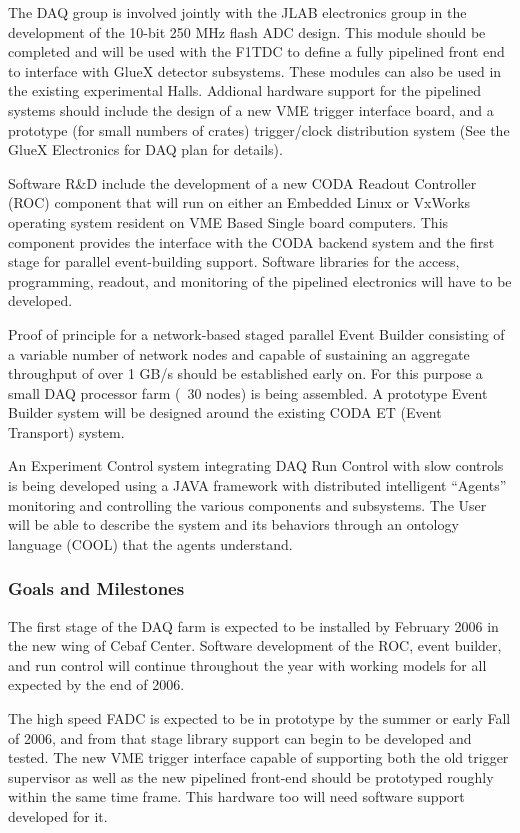 \documentclass[10pt]{article}
\begin{document}
The DAQ group is involved jointly with the JLAB electronics group in the 
development of the 10-bit 250 MHz flash ADC design. This module should be
completed and will be used with the F1TDC to define a fully pipelined front
end to interface with GlueX detector subsystems. These modules can also be
used in the existing experimental Halls. Addional hardware support for the 
pipelined systems should include the design of a new VME trigger interface 
board, and a prototype (for small numbers of crates) trigger/clock 
distribution system (See the GlueX Electronics for DAQ plan for details). 

Software R\&D include the development of a new CODA Readout Controller
(ROC) component that will run on either an Embedded Linux or VxWorks
operating system resident on VME Based Single board computers. This
component provides the interface with the CODA backend system and the
first stage for parallel event-building support. Software libraries for 
the access, programming, readout, and monitoring of the pipelined 
electronics will have to be developed.

Proof of principle for a network-based staged parallel Event Builder
consisting of a variable number of network nodes and capable of sustaining
an aggregate throughput of over 1 GB/s should be established early on. For
this purpose a small DAQ processor farm (~30 nodes) is being assembled. A
prototype Event Builder system will be designed around the existing CODA ET
(Event Transport) system. 

An Experiment Control system integrating DAQ Run Control with slow
controls is being developed using a JAVA framework with distributed
intelligent ``Agents'' monitoring and controlling the various components
and subsystems. The User will be able to describe the system and its
behaviors through an ontology language (COOL) that the agents understand.
 

\subsubsection*{Goals and Milestones}

The first stage of the DAQ farm is expected to be installed by February
2006 in the new wing of Cebaf Center. Software development of the ROC,
event builder, and run control will continue throughout the year with
working models for all expected by the end of 2006. 

The high speed FADC is expected to be in prototype by the summer or early 
Fall of 2006, and from that stage library support can begin to be developed and
tested. The new VME trigger interface capable of supporting both the old
trigger supervisor as well as the new pipelined front-end should be
prototyped roughly within the same time frame. This hardware too will need software
support developed for it. 
\end{document}
